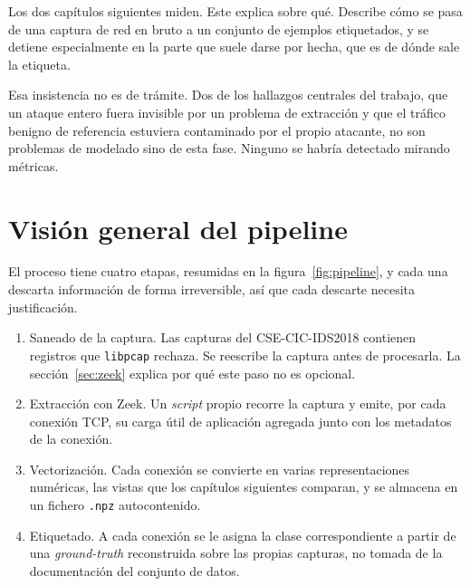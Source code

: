 %

Los dos capítulos siguientes miden. Este explica sobre qué. Describe cómo se
pasa de una captura de red en bruto a un conjunto de ejemplos etiquetados, y se
detiene especialmente en la parte que suele darse por hecha, que es de dónde
sale la etiqueta.

Esa insistencia no es de trámite. Dos de los hallazgos centrales del trabajo, que
un ataque entero fuera invisible por un problema de extracción y que el tráfico
benigno de referencia estuviera contaminado por el propio atacante, no son
problemas de modelado sino de esta fase. Ninguno se habría detectado mirando
métricas.

\section{Visión general del pipeline}
\label{sec:pipeline}

El proceso tiene cuatro etapas, resumidas en la figura~\ref{fig:pipeline}, y
cada una descarta información de forma irreversible, así que cada descarte
necesita justificación.

\begin{enumerate}
  \item Saneado de la captura. Las capturas del CSE-CIC-IDS2018 contienen
        registros que \texttt{libpcap} rechaza. Se reescribe la captura antes de
        procesarla. La sección~\ref{sec:zeek} explica por qué este paso no es
        opcional.
  \item Extracción con Zeek. Un \emph{script} propio recorre la captura y emite,
        por cada conexión TCP, su carga útil de aplicación agregada junto con los
        metadatos de la conexión.
  \item Vectorización. Cada conexión se convierte en varias representaciones
        numéricas, las vistas que los capítulos siguientes comparan, y se
        almacena en un fichero \texttt{.npz} autocontenido.
  \item Etiquetado. A cada conexión se le asigna la clase correspondiente a
        partir de una \emph{ground-truth} reconstruida sobre las propias
        capturas, no tomada de la documentación del conjunto de datos.
\end{enumerate}


